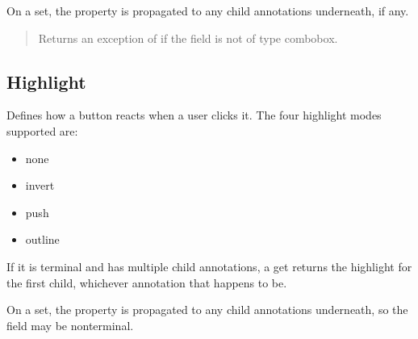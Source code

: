 \documentclass[letterpaper,12pt,english,openany,oneside]{sphinxmanual}
\begin{document}
On a set, the property is propagated to any child annotations underneath, if any.

\label{\detokenize{IAC_API_FormsIntro:syntax-17}}

\begin{sphinxVerbatim}[commandchars=\\\{\}]
\PYG{p}{[}\PYG{p}{]} 
\end{sphinxVerbatim}
\label{\detokenize{IAC_API_FormsIntro:exceptions-10}}
\begin{quote}

Returns  an exception of  if the field is not of type combobox.
\end{quote}
\label{\detokenize{IAC_API_FormsIntro:example-11}}

\begin{sphinxVerbatim}[commandchars=\\\{\}]
  
\end{sphinxVerbatim}




\subsection{Highlight}
\label{\detokenize{IAC_API_FormsIntro:highlight}}
Defines how a button reacts when a user clicks it. The four highlight modes supported are:
\begin{itemize}
\item {} 
none

\item {} 
invert

\item {} 
push

\item {} 
outline

\end{itemize}

If it is terminal and has multiple child annotations, a get returns the highlight for the first child, whichever annotation that happens to be.

On a set, the property is propagated to any child annotations underneath, so the field may be non\sphinxhyphen{}terminal.

\label{\detokenize{IAC_API_FormsIntro:syntax-18}}
\end{document}
